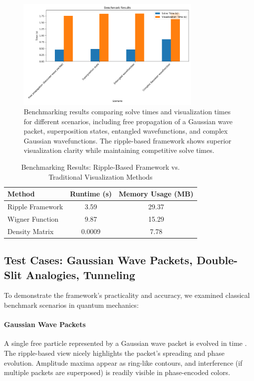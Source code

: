 \documentclass{article}
\begin{document}
\begin{figure}[H]
    \centering
    \includegraphics[width=0.8\textwidth]{images/benchmark_results.png}
    \caption{Benchmarking results comparing solve times and visualization times for different scenarios, including free propagation of a Gaussian wave packet, superposition states, entangled wavefunctions, and complex Gaussian wavefunctions. The ripple-based framework shows superior visualization clarity while maintaining competitive solve times.}
    \label{fig:benchmark_results}
\end{figure}

\begin{table}[H]
\centering
\caption{Benchmarking Results: Ripple-Based Framework vs. Traditional Visualization Methods}
\begin{tabular}{|l|c|c|}
    \hline
    \textbf{Method} & \textbf{Runtime (s)} & \textbf{Memory Usage (MB)} \\
    \hline
    Ripple Framework    & 3.59        & 29.37             \\
    Wigner Function     & 9.87        & 15.29             \\
    Density Matrix      & 0.0009      & 7.78              \\
    \hline
\end{tabular}
\label{tab:benchmark_methods}
\end{table}

\subsection{Test Cases: Gaussian Wave Packets, Double-Slit Analogies, Tunneling}
\label{subsec:test-cases}
To demonstrate the framework’s practicality and accuracy, we examined classical benchmark scenarios in quantum mechanics:

\paragraph{Gaussian Wave Packets}
A single free particle represented by a Gaussian wave packet is evolved in time \cite{griffiths2005introduction, feynmanlectures}. The ripple-based view nicely highlights the packet’s spreading and phase evolution. Amplitude maxima appear as ring-like contours, and interference (if multiple packets are superposed) is readily visible in phase-encoded colors.
\end{document}
